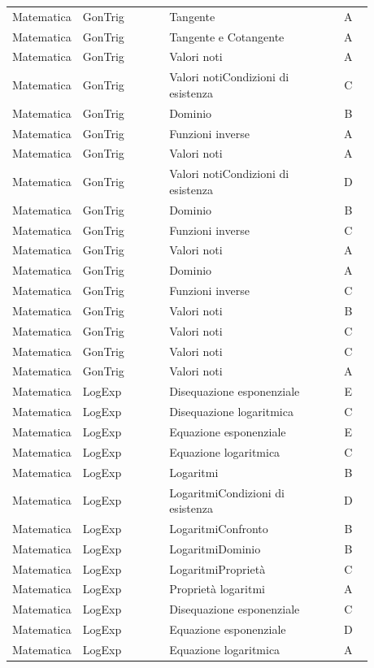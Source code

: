 \documentclass[20pt, a4paper]{article}
\begin{document}
\begin{longtable}{@{}>{\raggedright\arraybackslash}p{0.18\linewidth}>{\raggedright\arraybackslash}p{0.24\linewidth}>{\raggedright\arraybackslash}p{0.46\linewidth}c@{}}
Matematica & GonTrig & Tangente & A \\
Matematica & GonTrig & Tangente e Cotangente & A \\
Matematica & GonTrig & Valori noti & A \\
Matematica & GonTrig & Valori notiCondizioni di esistenza & C \\
Matematica & GonTrig & Dominio & B \\
Matematica & GonTrig & Funzioni inverse & A \\
Matematica & GonTrig & Valori noti & A \\
Matematica & GonTrig & Valori notiCondizioni di esistenza & D \\
Matematica & GonTrig & Dominio & B \\
Matematica & GonTrig & Funzioni inverse & C \\
Matematica & GonTrig & Valori noti & A \\
Matematica & GonTrig & Dominio & A \\
Matematica & GonTrig & Funzioni inverse & C \\
Matematica & GonTrig & Valori noti & B \\
Matematica & GonTrig & Valori noti & C \\
Matematica & GonTrig & Valori noti & C \\
Matematica & GonTrig & Valori noti & A \\
Matematica & LogExp & Disequazione esponenziale & E \\
Matematica & LogExp & Disequazione logaritmica & C \\
Matematica & LogExp & Equazione esponenziale & E \\
Matematica & LogExp & Equazione logaritmica & C \\
Matematica & LogExp & Logaritmi & B \\
Matematica & LogExp & LogaritmiCondizioni di esistenza & D \\
Matematica & LogExp & LogaritmiConfronto & B \\
Matematica & LogExp & LogaritmiDominio & B \\
Matematica & LogExp & LogaritmiProprietà & C \\
Matematica & LogExp & Proprietà logaritmi & A \\
Matematica & LogExp & Disequazione esponenziale & C \\
Matematica & LogExp & Equazione esponenziale & D \\
Matematica & LogExp & Equazione logaritmica & A \\

\end{longtable}
\end{document}
